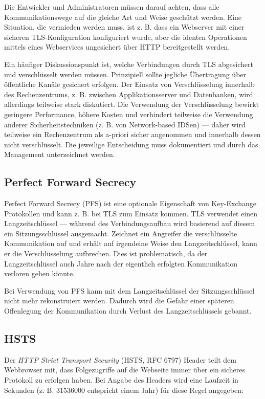 Die Entwickler und Administratoren müssen darauf achten, dass alle Kommunikationswege auf die gleiche Art und Weise geschützt werden. Eine Situation, die vermieden werden muss, ist z. B. dass ein Webserver mit einer sicheren TLS-Konfiguration konfiguriert wurde, aber die identen Operationen mittels eines Webservices ungesichert über HTTP bereitgestellt werden.

Ein häufiger Diskussionspunkt ist, welche Verbindungen durch TLS abgesichert und verschlüsselt werden müssen. Prinzipiell sollte jegliche Übertragung über öffentliche Kanäle gesichert erfolgen. Der Einsatz von Verschlüsselung innerhalb des Rechenzentrums, z. B. zwischen Applikationsserver und Datenbanken, wird allerdings teilweise stark diskutiert. Die Verwendung der Verschlüsselung bewirkt geringere Performance, höhere Kosten und verhindert teilweise die Verwendung anderer Sicherheitstechniken (z. B. von Network-based IDSen) --- daher wird teilweise ein Rechenzentrum als a-priori sicher angenommen und innerhalb dessen nicht verschlüsselt. Die jeweilige Entscheidung muss dokumentiert und durch das Management unterzeichnet werden.

\subsection{Perfect Forward Secrecy}

Perfect Forward Secrecy (PFS) ist eine optionale Eigenschaft von Key-Exchange Protokollen und kann z. B. bei TLS zum Einsatz kommen. TLS verwendet einen Langzeitschlüssel --- während des Verbindungsaufbau wird basierend auf diesem ein Sitzungsschlüssel ausgemacht. Zeichnet ein Angreifer die verschlüsselte Kommunikation auf und erhält auf irgendeine Weise den Langzeitschlüssel, kann er die Verschlüsselung aufbrechen. Dies ist problematisch, da der Langzeitschlüssel auch Jahre nach der eigentlich erfolgten Kommunikation verloren gehen könnte.

Bei Verwendung von PFS kann mit dem Langzeitschlüssel der Sitzungsschlüssel nicht mehr rekonstruiert werden. Dadurch wird die Gefahr einer späteren Offenlegung der Kommunikation durch Verlust des Langzeitschlüssels gebannt.

\subsection{HSTS}
\label{hsts}

Der \textit{HTTP Strict Transport Security} (HSTS, RFC 6797) Header teilt dem Webbrowser mit, dass Folgezugriffe auf die Webseite immer über ein sicheres Protokoll zu erfolgen haben. Bei Angabe des Headers wird eine Laufzeit in Sekunden (z. B. 31536000 entspricht einem Jahr) für diese Regel angegeben:

